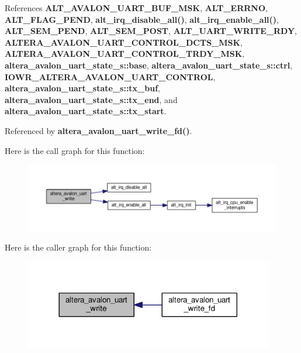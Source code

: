 References {\bf A\+L\+T\+\_\+\+A\+V\+A\+L\+O\+N\+\_\+\+U\+A\+R\+T\+\_\+\+B\+U\+F\+\_\+\+M\+SK}, {\bf A\+L\+T\+\_\+\+E\+R\+R\+NO}, {\bf A\+L\+T\+\_\+\+F\+L\+A\+G\+\_\+\+P\+E\+ND}, {\bf alt\+\_\+irq\+\_\+disable\+\_\+all()}, {\bf alt\+\_\+irq\+\_\+enable\+\_\+all()}, {\bf A\+L\+T\+\_\+\+S\+E\+M\+\_\+\+P\+E\+ND}, {\bf A\+L\+T\+\_\+\+S\+E\+M\+\_\+\+P\+O\+ST}, {\bf A\+L\+T\+\_\+\+U\+A\+R\+T\+\_\+\+W\+R\+I\+T\+E\+\_\+\+R\+DY}, {\bf A\+L\+T\+E\+R\+A\+\_\+\+A\+V\+A\+L\+O\+N\+\_\+\+U\+A\+R\+T\+\_\+\+C\+O\+N\+T\+R\+O\+L\+\_\+\+D\+C\+T\+S\+\_\+\+M\+SK}, {\bf A\+L\+T\+E\+R\+A\+\_\+\+A\+V\+A\+L\+O\+N\+\_\+\+U\+A\+R\+T\+\_\+\+C\+O\+N\+T\+R\+O\+L\+\_\+\+T\+R\+D\+Y\+\_\+\+M\+SK}, {\bf altera\+\_\+avalon\+\_\+uart\+\_\+state\+\_\+s\+::base}, {\bf altera\+\_\+avalon\+\_\+uart\+\_\+state\+\_\+s\+::ctrl}, {\bf I\+O\+W\+R\+\_\+\+A\+L\+T\+E\+R\+A\+\_\+\+A\+V\+A\+L\+O\+N\+\_\+\+U\+A\+R\+T\+\_\+\+C\+O\+N\+T\+R\+OL}, {\bf altera\+\_\+avalon\+\_\+uart\+\_\+state\+\_\+s\+::tx\+\_\+buf}, {\bf altera\+\_\+avalon\+\_\+uart\+\_\+state\+\_\+s\+::tx\+\_\+end}, and {\bf altera\+\_\+avalon\+\_\+uart\+\_\+state\+\_\+s\+::tx\+\_\+start}.



Referenced by {\bf altera\+\_\+avalon\+\_\+uart\+\_\+write\+\_\+fd()}.



Here is the call graph for this function\+:
\nopagebreak
\begin{figure}[H]
\begin{center}
\leavevmode
\includegraphics[width=350pt]{d2/de5/altera__avalon__uart__fd_8c_a056fd610f48d6d53a851d36d949bb7c5_cgraph}
\end{center}
\end{figure}




Here is the caller graph for this function\+:
\nopagebreak
\begin{figure}[H]
\begin{center}
\leavevmode
\includegraphics[width=308pt]{d2/de5/altera__avalon__uart__fd_8c_a056fd610f48d6d53a851d36d949bb7c5_icgraph}
\end{center}
\end{figure}


